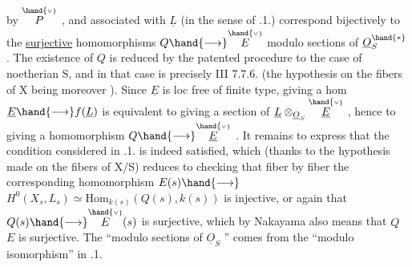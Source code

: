 
by $\overset{\hand{\scriptscriptstyle\vee}}{P}$ , and associated with $\underline{L}$ (in the sense of .1.) correspond bijectively
to the\hand{*} \uline{surjective} homomorphisms $Q\hand{\longrightarrow}\overset{\hand{\scriptscriptstyle\vee}}{E}$\hand{,} modulo  sections of $\underline{O}_S^{\hand{*}}$ .\hand{$\blacktriangledown$}
The existence of $Q$ is reduced by the patented procedure to the case of noetherian S,
and in that case is precisely III 7.7.6. (the hypothesis on the
fibers of X being moreover ).
Since $\underline{E}$ is loc free of finite type,
giving a hom $\underline{E}\hand{\longrightarrow} f(\underline{L})$ is equivalent to giving a section of
$\underline{L}\otimes_{\underline{O}_S}\overset{\hand{\scriptscriptstyle\vee}}{\underline{E}}$ , hence to giving a homomorphism $Q\hand{\longrightarrow}\overset{\hand{\scriptscriptstyle\vee}}{\underline{E}}$ . It remains to express
that the condition considered in .1. is indeed satisfied, which (thanks to
the hypothesis made on the fibers of X/S) reduces to checking that
fiber by fiber the corresponding homomorphism $E(s)\hand{\longrightarrow}$ \hand{$\vee$}
$H^0(X_s,L_s)\simeq\mathrm{Hom}_{k(s)}(Q(s),k(s))$ is injective, or again that $Q(s)\hand{\longrightarrow}\overset{\hand{\scriptscriptstyle\vee}}{E}(s)$ is surjective,
which by Nakayama also means that $Q$ \quad $E$ is surjective. The ``modulo
sections of $\underline{O}_S$ '' comes from the ``modulo isomorphism'' in .1.\hand{/}


